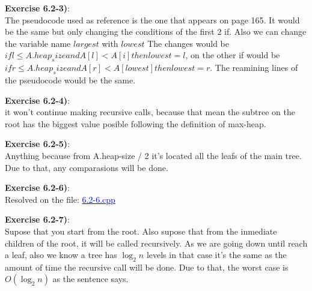 \documentclass{article}
\newcounter{exercise}[section]   %
\begin{document}
\textbf{Exercise 6.2-3)}:\\
The pseudocode used as reference is the one that appears on page 165.
It would be the same but only changing the conditions of the first 2 if. Also we can change
the variable name \(largest\) with \(lowest\)
The changes would be \(if l \leq A.heap_size and A[l] < A[i] then lowest = l\), on the other
if would be \(if r \leq A.heap_size and A[r] < A[lowest] then lowest = r\). The reamining
lines of the pseudocode would be the same.

\textbf{Exercise 6.2-4)}:\\
it won't continue making recursive calls, because that mean the subtree on the root has the 
biggest value posible following the definition of max-heap.

\textbf{Exercise 6.2-5)}:\\
Anything because from A.heap-size / 2 it's located all the leafs of the main tree. Due to 
that, any comparasions will be done.

\textbf{Exercise 6.2-6)}:\\
Resolved on the file: \href{https://github.com/Graburr/Algorithms_CLRS_4ed_solutions/blob/main/chapter2/Sorting_and_Order_Statics/6.2-6.cpp}
{\textcolor{Blue}{6.2-6.cpp}}

\textbf{Exercise 6.2-7)}:\\
Supose that you start from the root. Also supose that from the inmediate children of the 
root, it will be called recursively. As we are going down until reach a leaf, also we 
know a tree has \(\log_2 n \) levels in that case it's the same as the amount of time
the recursive call will be done. Due to that, the worst case is \(O(\log_2 n)\) as the 
sentence says.
\end{document}
